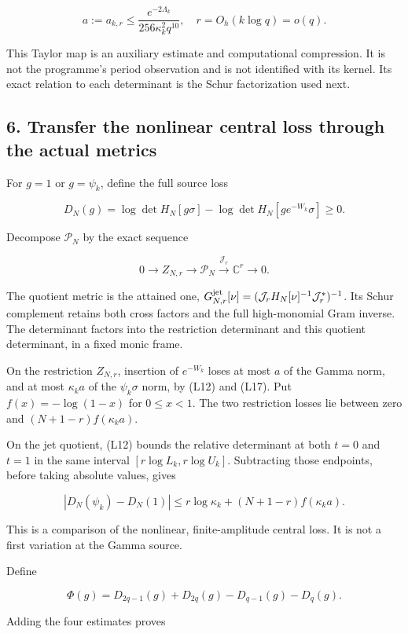 \[
a:=a_{k,r}\le\frac{e^{-2\Lambda_k}}{256\kappa_k^2q^{10}},
\quad r=O_h(k\log q)=o(q).
\tag{L20}
\]

This Taylor map is an auxiliary estimate and computational compression. It is not the programme's period observation and is not identified with its kernel. Its exact relation to each determinant is the Schur factorization used next.

\subsection{6. Transfer the nonlinear central loss through the actual metrics}\label{loc:transfer-the-nonlinear-central-loss-through-the-actual-metrics}

For \(g=1\) or \(g=\psi_k\), define the full source loss

\[
D_N(g)=\log\det H_N[g\sigma]-\log\det H_N[ge^{-W_k}\sigma]\ge0.
\tag{L21}
\]

Decompose \(\mathcal P_N\) by the exact sequence

\[
0\longrightarrow Z_{N,r}\longrightarrow\mathcal P_N
\xrightarrow{\mathcal J_r}\mathbb C^r\longrightarrow0.
\]

The quotient metric is the attained one,
\(G_{N,r}^{\rm jet}[\nu]=(\mathcal J_rH_N[\nu]^{-1}\mathcal J_r^*)^{-1}\).
Its Schur complement retains both cross factors and the full high-monomial Gram inverse. The determinant factors into the restriction determinant and this quotient determinant, in a fixed monic frame.

On the restriction \(Z_{N,r}\), insertion of \(e^{-W_k}\) loses at most \(a\) of the Gamma norm, and at most \(\kappa_k a\) of the \(\psi_k\sigma\) norm, by (L12) and (L17). Put \(f(x)=-\log(1-x)\) for \(0\le x<1\). The two restriction losses lie between zero and \((N+1-r)f(\kappa_k a)\).

On the jet quotient, (L12) bounds the relative determinant at both \(t=0\) and \(t=1\) in the same interval \([r\log L_k,r\log U_k]\). Subtracting those endpoints, before taking absolute values, gives

\[
\boxed{|D_N(\psi_k)-D_N(1)|
\le r\log\kappa_k+(N+1-r)f(\kappa_k a).}
\tag{L22}
\]

This is a comparison of the nonlinear, finite-amplitude central loss. It is not a first variation at the Gamma source.

Define

\[
\Phi(g)=D_{2q-1}(g)+D_{2q}(g)-D_{q-1}(g)-D_q(g).
\]

Adding the four estimates proves

